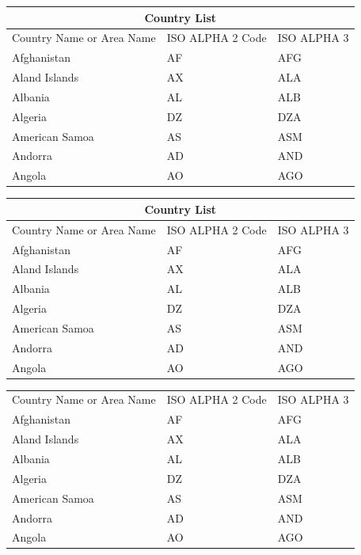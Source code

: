 \documentclass{article}
\begin{document}
{
\begin{tabular}{ |p{3cm}|p{3cm}|p{3cm}|  }
\hline
\multicolumn{3}{|c|}{Country List} \\
\hline
Country Name     or Area Name& ISO ALPHA 2 Code &ISO ALPHA 3 \\
\hline
Afghanistan & AF &AFG \\
Aland Islands & AX   & ALA \\
Albania &AL & ALB \\
Algeria    &DZ & DZA \\
American Samoa & AS & ASM \\
Andorra & AD & AND   \\
Angola & AO & AGO \\
\hline
\end{tabular}
}

\setlength{\arrayrulewidth}{1mm}
\setlength{\tabcolsep}{18pt}
\renewcommand{\arraystretch}{2.5}

{
\begin{tabular}{ |p{3cm}|p{3cm}|p{3cm}|  }
\hline
\multicolumn{3}{|c|}{Country List} \\
\hline
Country Name     or Area Name& ISO ALPHA 2 Code &ISO ALPHA 3 \\
\hline
Afghanistan & AF &AFG \\
Aland Islands & AX   & ALA \\
Albania &AL & ALB \\
Algeria    &DZ & DZA \\
American Samoa & AS & ASM \\
Andorra & AD & AND   \\
Angola & AO & AGO \\
\hline
\end{tabular}
}
\setlength{\arrayrulewidth}{1mm}
\setlength{\tabcolsep}{18pt}
\renewcommand{\arraystretch}{2.5}
 
 
 
\begin{tabular}{ |s|p{3cm}|p{3cm}|  }
\hline
{}  \\
\hline
Country Name    or Area Name& ISO ALPHA 2 Code &ISO ALPHA 3 \\
\hline
Afghanistan & AF &AFG \\
Aland Islands & AX & ALA \\
Albania   &AL & ALB \\
Algeria  &DZ & DZA \\
American Samoa & AS & ASM \\
Andorra & AD &  AND    \\
Angola & AO & AGO \\
\hline
\end{tabular}
\end{document}
